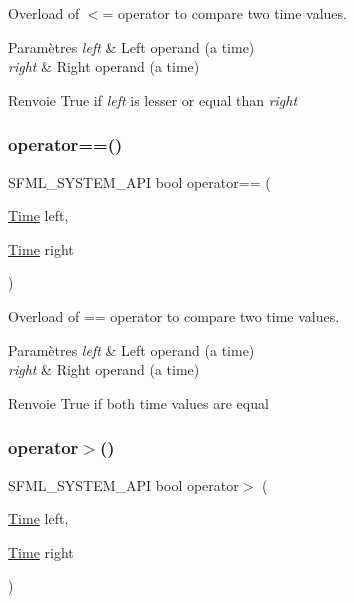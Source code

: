 Overload of $<$= operator to compare two time values. 


\begin{DoxyParams}{Paramètres}
{\em left} & Left operand (a time) \\
\hline
{\em right} & Right operand (a time)\\
\hline
\end{DoxyParams}
\begin{DoxyReturn}{Renvoie}
True if {\itshape left} is lesser or equal than {\itshape right} 
\end{DoxyReturn}
\mbox{\label{classsf_1_1Time_a2b8453227f651e9d5db3663fa08c47e2}} 
\subsubsection{\texorpdfstring{operator==()}{operator==()}}
{\footnotesize\ttfamily S\+F\+M\+L\+\_\+\+S\+Y\+S\+T\+E\+M\+\_\+\+A\+PI bool operator== (\begin{DoxyParamCaption}\item[{\hyperlink{classsf_1_1Time}{Time}}]{left,  }\item[{\hyperlink{classsf_1_1Time}{Time}}]{right }\end{DoxyParamCaption})\hspace{0.3cm}{\ttfamily [related]}}



Overload of == operator to compare two time values. 


\begin{DoxyParams}{Paramètres}
{\em left} & Left operand (a time) \\
\hline
{\em right} & Right operand (a time)\\
\hline
\end{DoxyParams}
\begin{DoxyReturn}{Renvoie}
True if both time values are equal 
\end{DoxyReturn}
\mbox{\label{classsf_1_1Time_a23978402846bf3c7ac54a3f2c6b397a2}} 
\subsubsection{\texorpdfstring{operator$>$()}{operator>()}}
{\footnotesize\ttfamily S\+F\+M\+L\+\_\+\+S\+Y\+S\+T\+E\+M\+\_\+\+A\+PI bool operator$>$ (\begin{DoxyParamCaption}\item[{\hyperlink{classsf_1_1Time}{Time}}]{left,  }\item[{\hyperlink{classsf_1_1Time}{Time}}]{right }\end{DoxyParamCaption})\hspace{0.3cm}{\ttfamily [related]}}



